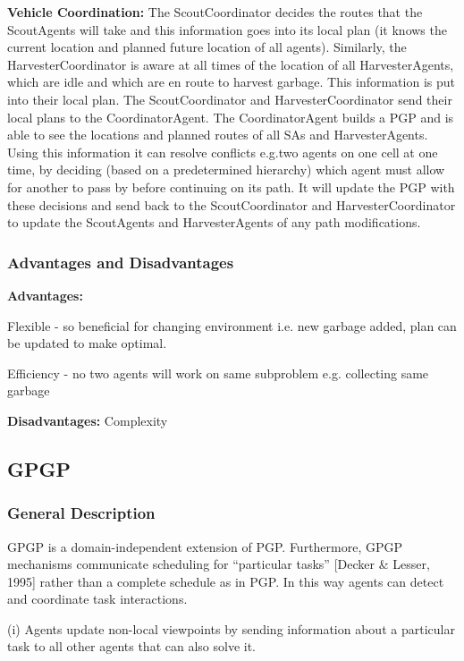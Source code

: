 \textbf{Vehicle Coordination:} The ScoutCoordinator decides the routes that the ScoutAgents will take and this information goes into its local plan (it knows the current location and planned future location of all agents). Similarly, the HarvesterCoordinator is aware at all times of the location of all HarvesterAgents, which are idle and which are en route to harvest garbage. This information is put into their local plan. The ScoutCoordinator and HarvesterCoordinator send their local plans to the CoordinatorAgent. The CoordinatorAgent builds a PGP and is able to see the locations and planned routes of all SAs and HarvesterAgents. Using this information it can resolve conflicts e.g.two agents on one cell at one time, by deciding (based on a predetermined hierarchy) which agent must allow for another to pass by before continuing on its path. It will update the PGP with these decisions and send back to the ScoutCoordinator and HarvesterCoordinator to update the ScoutAgents and HarvesterAgents of any path modifications.

\subsubsection{Advantages and Disadvantages}

\textbf{Advantages:}

Flexible - so beneficial for changing environment i.e. new garbage added, plan can be updated to make optimal.

Efficiency - no two agents will work on same subproblem e.g. collecting same garbage

\textbf{Disadvantages:} Complexity

\subsection{GPGP}

\subsubsection{General Description}

GPGP is a domain-independent extension of PGP. Furthermore, GPGP mechanisms communicate scheduling for ``particular tasks'' [Decker \& Lesser, 1995] rather than a complete schedule as in PGP. In this way agents can detect and coordinate task interactions. 

(i) Agents update non-local viewpoints by sending information about a particular task to all other agents that can also solve it.

